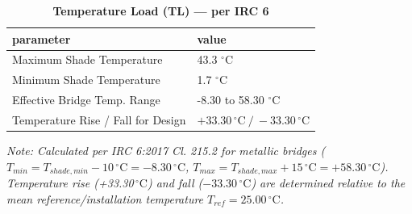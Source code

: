 \documentclass[12pt,a4paper]{report}
\numberwithin{table}{chapter}
\numberwithin{figure}{chapter}
\begin{document}
\vspace{1em}
\begin{longtable}{|L{5.5cm}|p{10.0cm}|}
\caption{\textbf{Temperature Load (TL) --- per IRC 6}}\\
\hline
\textbf{parameter} & \textbf{value} \\
\hline
\textnormal{Maximum Shade Temperature} & 43.3 $^\circ$C \\[6pt]
\hline
\textnormal{Minimum Shade Temperature} & 1.7 $^\circ$C \\[6pt]
\hline
\textnormal{Effective Bridge Temp. Range} & -8.30 to 58.30 $^\circ$C \\[6pt]
\hline
\textnormal{Temperature Rise / Fall for Design} & $+33.30\,^\circ\mathrm{C} \ / \ -33.30\,^\circ\mathrm{C}$ \\[6pt]
\hline
\end{longtable}
\noindent\textit{Note: Calculated per IRC 6:2017 Cl. 215.2 for metallic bridges ($T_{min} = T_{shade,min} - 10\,^\circ\text{C} = -8.30\,^\circ\text{C}$, $T_{max} = T_{shade,max} + 15\,^\circ\text{C} = +58.30\,^\circ\text{C}$). Temperature rise (+33.30\,$^\circ\text{C}$) and fall ($-33.30\,^\circ\text{C}$) are determined relative to the mean reference/installation temperature $T_{ref} = 25.00\,^\circ\text{C}$.}
\end{document}
